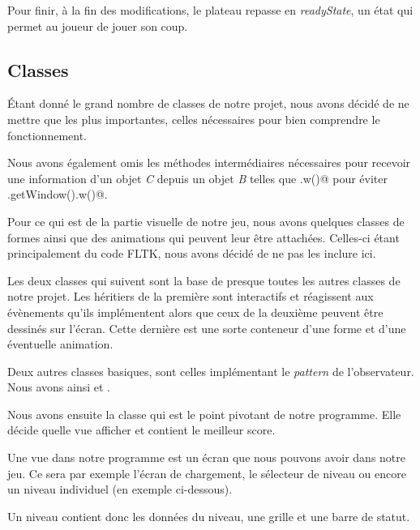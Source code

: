 \documentclass[11pt,a4paper]{article}
\newcommand{\addcode}[3]{
	\begin{center}
		
	\end{center}
}
\begin{document}
Pour finir, à la fin des modifications, le plateau repasse en \emph{readyState}, un état qui permet au 
joueur de jouer son coup.

\subsection{Classes}

Étant donné le grand nombre de classes de notre projet, nous
avons décidé de ne mettre que les plus importantes, celles
nécessaires pour bien comprendre le fonctionnement.

Nous avons également omis les méthodes intermédiaires
nécessaires pour recevoir une information d'un objet
\emph{C} depuis un objet \emph{B} telles que \verb@b.w()@ pour
éviter \verb@b.getWindow().w()@.

Pour ce qui est de la partie visuelle de notre jeu, nous
avons quelques classes de formes ainsi que des animations
qui peuvent leur être attachées. Celles-ci étant
principalement du code FLTK, nous avons décidé de ne pas les
inclure ici.

Les deux classes qui suivent sont la base de presque toutes
les autres classes de notre projet. Les héritiers de la
première sont interactifs et réagissent aux évènements
qu'ils implémentent alors que ceux de la deuxième peuvent
être dessinés sur l'écran. Cette dernière est une sorte conteneur d'une forme et
d'une éventuelle animation.

\addcode{code/interactive.hpp}{C++}{}{}
\addcode{code/drawableContainer.hpp}{C++}{}{}

Deux autres classes basiques, sont celles implémentant le
\emph{pattern} de l'observateur. Nous avons ainsi \verb@Observer@
et \verb@Subject@.

Nous avons ensuite la classe \verb@Game@ qui est le point
pivotant de notre programme. Elle décide quelle vue
afficher et contient le meilleur score.

Une vue dans notre programme est un écran que nous pouvons
avoir dans notre jeu. Ce sera par exemple l'écran de
chargement, le sélecteur de niveau ou encore un niveau
individuel (en exemple ci-dessous).

\addcode{code/game.hpp}{C++}{}{}

\addcode{code/view.hpp}{C++}{}{}
\addcode{code/level.hpp}{C++}{}{}

Un niveau contient donc les données du niveau, une grille
et une barre de statut.
\end{document}
